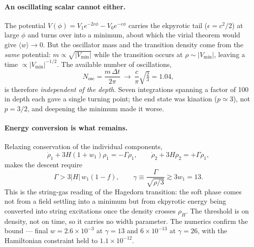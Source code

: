 \documentclass[a4paper,11pt]{article}
\begin{document}
\paragraph{An oscillating scalar cannot either.} The potential $V(\phi)=V_1e^{-2c\phi}-V_0e^{-c\phi}$ carries the ekpyrotic tail ($\epsilon=c^2/2$) at large $\phi$ and turns over into a minimum, about which the virial theorem would give $\langle w\rangle\to0$. But the oscillator mass and the transition density come from the \emph{same} potential: $m\propto\sqrt{|V_{\min}|}$ while the transition occurs at $\rho\sim|V_{\min}|$, leaving a time $\propto|V_{\min}|^{-1/2}$. The available number of oscillations,
\begin{equation}
N_{\mathrm{osc}}=\frac{m\,\Delta t}{2\pi}\ \longrightarrow\ \frac{c}{\pi}\sqrt{\tfrac{2}{3}}=1.04 ,
\end{equation}
is therefore \emph{independent of the depth}. Seven integrations spanning a factor of 100 in depth each gave a single turning point; the end state was kination ($p\simeq3$), not $p=3/2$, and deepening the minimum made it worse.

\paragraph{Energy conversion is what remains.} Relaxing conservation of the individual components,
\begin{equation}
\dot\rho_1+3H(1+w_1)\rho_1=-\Gamma\rho_1,\qquad \dot\rho_2+3H\rho_2=+\Gamma\rho_1 ,
\end{equation}
makes the descent require
\begin{equation}
\Gamma>3|H|\,w_1(1-f),\qquad \gamma\equiv\frac{\Gamma}{\sqrt{\rho/3}}\gtrsim 3w_1=13 .
\end{equation}
This is the string-gas reading of the Hagedorn transition: the soft phase comes not from a field settling into a minimum but from ekpyrotic energy being converted into string excitations once the density crosses $\rho_H$. The threshold is on density, not on time, so it carries no width parameter. The numerics confirm the bound --- final $w=2.6\times10^{-3}$ at $\gamma=13$ and $6\times10^{-13}$ at $\gamma=26$, with the Hamiltonian constraint held to $1.1\times10^{-12}$.
\end{document}

